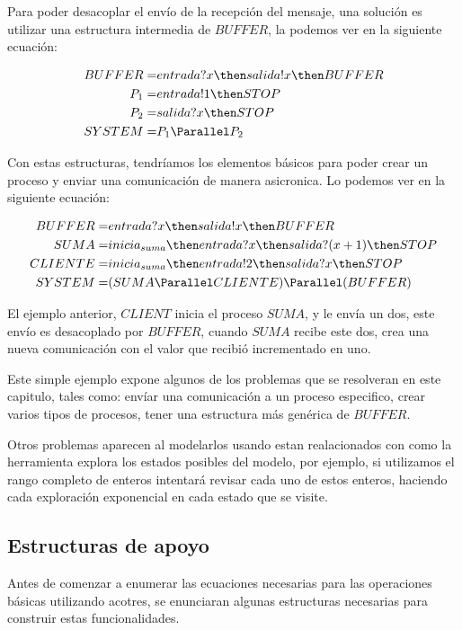 Para poder desacoplar el envío de la recepción del mensaje, una solución es utilizar una estructura intermedia de $BUFFER$, la podemos ver en la siguiente ecuación:

\begin{align*}
BUFFER =& entrada?x \then salida!x \then BUFFER \\
P_1 =& entrada!1 \then STOP \\
P_2 =& salida?x \then STOP \\
SYSTEM =& P_1 \Parallel P_2 \\
\end{align*}

Con estas estructuras, tendríamos los elementos básicos para poder crear un proceso y enviar una comunicación de manera asicronica. Lo podemos ver en la siguiente ecuación:

\begin{align*}
BUFFER =& entrada?x \then salida!x \then BUFFER\\
SUMA =& inicia_{suma} \then entrada?x \then salida?(x + 1) \then STOP \\
CLIENTE =& inicia_{suma}\then entrada!2 \then salida?x \then STOP \\
SYSTEM =& (SUMA \Parallel CLIENTE) \Parallel (BUFFER)\\
\end{align*}

El ejemplo anterior, $CLIENT$ inicia el proceso $SUMA$, y le envía un dos, este envío es desacoplado por $BUFFER$, cuando $SUMA$ recibe este dos, crea una nueva comunicación con el valor que recibió incrementado en uno.

Este simple ejemplo expone algunos de los problemas que se resolveran en este capitulo, tales como: envíar una comunicación a un proceso especifico, crear varios tipos de procesos, tener una estructura más genérica de $BUFFER$.

Otros problemas aparecen al modelarlos usando \FDR estan realacionados con como la herramienta explora los estados posibles del modelo, por ejemplo, si utilizamos el rango completo de enteros intentará revisar cada uno de estos enteros, haciendo cada exploración exponencial en cada estado que se visite.

\subsection{Estructuras de apoyo}

Antes de comenzar a enumerar las ecuaciones necesarias para las operaciones básicas utilizando acotres, se enunciaran algunas estructuras necesarias para construir estas funcionalidades.

